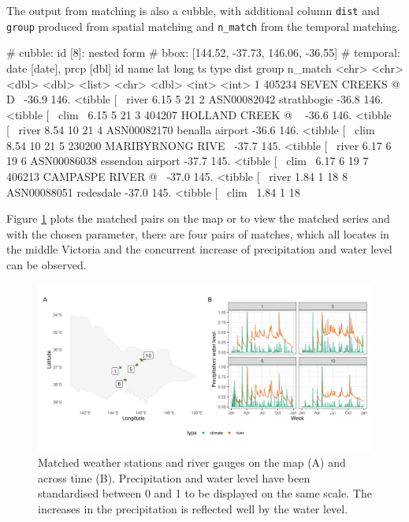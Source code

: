 \documentclass[
]{jss}
\begin{document}
The output from matching is also a cubble, with additional column
\texttt{dist} and \texttt{group} produced from spatial matching and
\texttt{n\_match} from the temporal matching.

\begin{CodeChunk}
\begin{CodeOutput}
# cubble:   id [8]: nested form
# bbox:     [144.52, -37.73, 146.06, -36.55]
# temporal: date [date], prcp [dbl]
  id          name                lat  long ts         type   dist group n_match
  <chr>       <chr>             <dbl> <dbl> <list>     <chr> <dbl> <int>   <int>
1 405234      SEVEN CREEKS @ D~ -36.9  146. <tibble [~ river  6.15     5      21
2 ASN00082042 strathbogie       -36.8  146. <tibble [~ clim~  6.15     5      21
3 404207      HOLLAND CREEK @ ~ -36.6  146. <tibble [~ river  8.54    10      21
4 ASN00082170 benalla airport   -36.6  146. <tibble [~ clim~  8.54    10      21
5 230200      MARIBYRNONG RIVE~ -37.7  145. <tibble [~ river  6.17     6      19
6 ASN00086038 essendon airport  -37.7  145. <tibble [~ clim~  6.17     6      19
7 406213      CAMPASPE RIVER @~ -37.0  145. <tibble [~ river  1.84     1      18
8 ASN00088051 redesdale         -37.0  145. <tibble [~ clim~  1.84     1      18
\end{CodeOutput}
\end{CodeChunk}

Figure \ref{fig:matching} plots the matched pairs on the map or to view
the matched series and with the chosen parameter, there are four pairs
of matches, which all locates in the middle Victoria and the concurrent
increase of precipitation and water level can be observed.

\begin{CodeChunk}
\begin{figure}

{\centering \includegraphics[width=1\linewidth]{figures/matching} 

}

\caption[Matched weather stations and river gauges on the map (A) and across time (B)]{Matched weather stations and river gauges on the map (A) and across time (B). Precipitation and water level have been standardised between 0 and 1 to be displayed on the same scale. The increases in the precipitation is reflected well by the water level.}\label{fig:matching}
\end{figure}
\end{CodeChunk}
\end{document}
